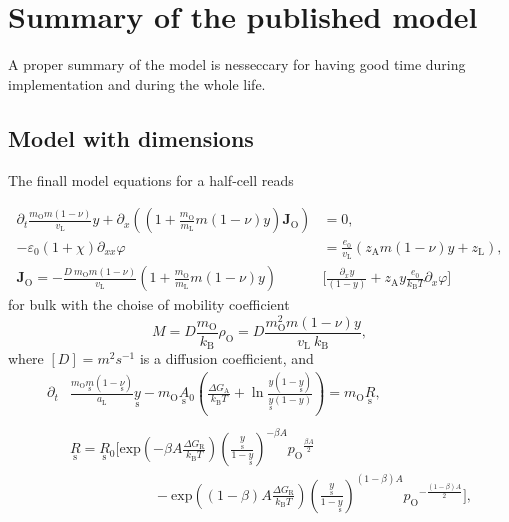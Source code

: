 \documentclass{article}
\numberwithin{equation}{section}
\newcommand{\us}[1]{\underset{\textrm{s}}{#1}{}}
\def\kB{k_\mathrm{B}}
\def\Ox{\mathrm{O}}
\def\zL{z_\mathrm{L}}
\def\mL{m_\mathrm{L}}
\def\vL{v_\mathrm{L}}
\def\aL{a_\mathrm{L}}
\def\DGA{\Delta G_\textrm{A}  }
\def\DGR{\Delta G_\textrm{R}  }
\begin{document}




\section{Summary of the published model}
A proper summary of the model is nesseccary for having good time during implementation and during the whole life. 

\subsection{Model with dimensions}
The finall model equations for a half-cell reads

\begin{subequations}
\begin{align}
\partial_t \frac{m_\Ox m (1- \nu)}{\vL} y
+
\partial_x 
\left(
	\left(
		1
		+
		\frac{m_\Ox}{\mL} m (1 - \nu) y
	\right)
	\bm J_\Ox
\right)
&= 
0,
\\
- \varepsilon_0 (1 + \chi) \partial_{xx} \varphi 
&= 
\frac{e_0}{\vL}
\left(
	z_\textrm{A} m (1 - \nu) y
	+
	\zL
\right),
\\
\bm J_\Ox 
=
- \frac{D \ m_\Ox m (1 - \nu)}{\vL}
\left(
	1
	+
	\frac{m_\Ox}{\mL} m (1 - \nu) y
\right)
&\Bigg[
	\frac	
	{\partial_x y}
	{(1- y)}
	+ 
	z_\textrm{A} y \frac{e_0}{\kB T}
	\partial_x \varphi
\Bigg]
\end{align}
\end{subequations}
for bulk with the choise of mobility coefficient 
$$M = D \frac{m_\Ox}{\kB} \rho_\Ox = D \frac{m_\Ox^2 m (1 - \nu) y}{\vL \ \kB},$$ 
where $[D] = m^2 s^{-1}$ is a diffusion coefficient, and
\begin{subequations}
\begin{align}
\partial_t &\frac{m_\Ox \us m (1- \us \nu)}{\aL} \us y
-
m_\Ox \us A_0 
\left(
	\frac{\DGA}{\kB T}
	+
	\ln \frac{y(1- \us y)}{\us y (1- y)}
\right)
=
m_\Ox \us R,
\\ \nonumber
\\
&\us R
=
\us R_0
\Bigg[
	\textrm{exp}
	\left(
		{-\beta A \frac{\DGR}{\kB T}}
	\right)
	\left(
		\frac{\us y}{1- \us y}
	\right)^{-\beta A}
	{p_\Ox}^{\frac{\beta A}{2}}
\\ \nonumber
	&\quad \quad \quad \quad \quad \quad	
	-
	\textrm{exp}
	\left(
		{(1-\beta) A \frac{\DGR}{\kB T}}
	\right)
	\left(
		\frac{\us y}{1- \us y}
	\right)^{(1-\beta) A}
	{p_\Ox}^{-\frac{(1-\beta) A}{2}}
\Bigg],
\end{align}
\end{subequations}
\end{document}

